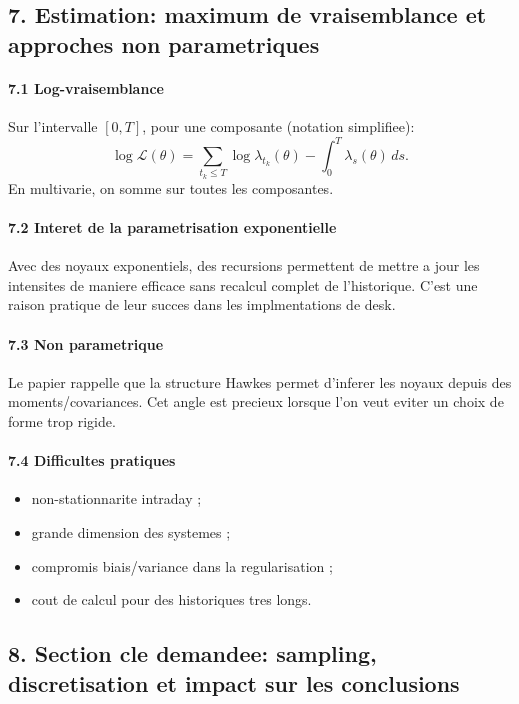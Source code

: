 \documentclass[11pt,a4paper]{article}
\begin{document}
\subsection*{7. Estimation: maximum de vraisemblance et approches non parametriques}

\paragraph{7.1 Log-vraisemblance}
Sur l'intervalle $[0,T]$, pour une composante (notation simplifiee):
\[
\log\mathcal{L}(\theta)=\sum_{t_k\le T}\log \lambda_{t_k}(\theta)-\int_0^T \lambda_s(\theta)\,ds.
\]
En multivarie, on somme sur toutes les composantes.

\paragraph{7.2 Interet de la parametrisation exponentielle}
Avec des noyaux exponentiels, des recursions permettent de mettre a jour les intensites de maniere efficace sans recalcul complet de l'historique. C'est une raison pratique de leur succes dans les implmentations de desk.

\paragraph{7.3 Non parametrique}
Le papier rappelle que la structure Hawkes permet d'inferer les noyaux depuis des moments/covariances. Cet angle est precieux lorsque l'on veut eviter un choix de forme trop rigide.

\paragraph{7.4 Difficultes pratiques}
\begin{itemize}[leftmargin=1.2cm]
    \item non-stationnarite intraday ;
    \item grande dimension des systemes ;
    \item compromis biais/variance dans la regularisation ;
    \item cout de calcul pour des historiques tres longs.
\end{itemize}

\subsection*{8. Section cle demandee: sampling, discretisation et impact sur les conclusions}
\end{document}
